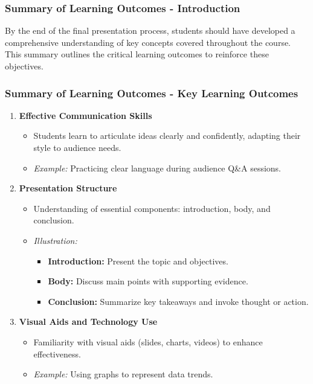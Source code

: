 \documentclass[aspectratio=169]{beamer}
\begin{document}
\begin{frame}[fragile]
    \frametitle{Summary of Learning Outcomes - Introduction}
    By the end of the final presentation process, students should have developed a comprehensive understanding of key concepts covered throughout the course. 
    This summary outlines the critical learning outcomes to reinforce these objectives.
\end{frame}

\begin{frame}[fragile]
    \frametitle{Summary of Learning Outcomes - Key Learning Outcomes}
    \begin{enumerate}
        \item \textbf{Effective Communication Skills}
        \begin{itemize}
            \item Students learn to articulate ideas clearly and confidently, adapting their style to audience needs.
            \item \textit{Example:} Practicing clear language during audience Q\&A sessions.
        \end{itemize}
        
        \item \textbf{Presentation Structure}
        \begin{itemize}
            \item Understanding of essential components: introduction, body, and conclusion.
            \item \textit{Illustration:} 
            \begin{itemize}
                \item \textbf{Introduction:} Present the topic and objectives.
                \item \textbf{Body:} Discuss main points with supporting evidence.
                \item \textbf{Conclusion:} Summarize key takeaways and invoke thought or action.
            \end{itemize}
        \end{itemize}
        
        \item \textbf{Visual Aids and Technology Use}
        \begin{itemize}
            \item Familiarity with visual aids (slides, charts, videos) to enhance effectiveness.
            \item \textit{Example:} Using graphs to represent data trends.
        \end{itemize}
    \end{enumerate}
\end{frame}
\end{document}
